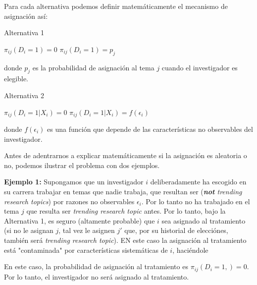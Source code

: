 \documentclass[12pt, letter]{article}
\begin{document}
Para cada alternativa podemos definir matemáticamente el mecanismo de asignación así:

\begin{algorithm}
\caption{Alternativa 1}
\begin{algorithmic}
            \STATE $\pi_{ij}(D_i = 1) = 0$ 
        \ELSE
            \STATE $\pi_{ij}(D_i = 1) = p_j$
        \ENDIF
    \ENDFOR
\ENDFOR
\end{algorithmic}
\end{algorithm}

donde $p_j$ es la probabilidad de asignación al tema $j$ cuando el investigador es elegible.

\begin{algorithm}
\caption{Alternativa 2}
\begin{algorithmic}
            \STATE $\pi_{ij}(D_i = 1 | X_i) = 0$
        \ELSE
            \STATE $\pi_{ij}(D_i = 1 | X_i) = f(\epsilon_i)$
        \ENDIF
    \ENDFOR
\ENDFOR
\end{algorithmic}
\end{algorithm}

donde $f(\epsilon_i)$ es una función que depende de las características no observables del investigador.

Antes de adentrarnos a explicar matemáticamente si la asignación es aleatoria o no, podemos ilustrar el problema con dos ejemplos.

\textbf{Ejemplo 1:} Supongamos que un investigador $i$ deliberadamente ha escogido en su carrera trabajar en temas que nadie trabaja, que resultan ser (\textit{\textbf{not} trending research topics}) por razones no observables $\epsilon_i$. Por lo tanto no ha trabajado en el tema $j$ que resulta ser \textit{trending research topic} antes. Por lo tanto, bajo la Alternativa 1, es seguro (altamente probable) que $i$ sea asignado al tratamiento (si no le asignan $j$, tal vez le asignen $j'$ que, por su historial de elecciónes, también será \textit{trending research topic}). EN este caso la asignación al tratamiento está "contaminada" por características sistemáticas de $i$, haciéndole 

En este caso, la probabilidad de asignación al tratamiento es $\pi_{ij}(D_i = 1, ) = 0$. Por lo tanto, el investigador no será asignado al tratamiento.
\end{document}
